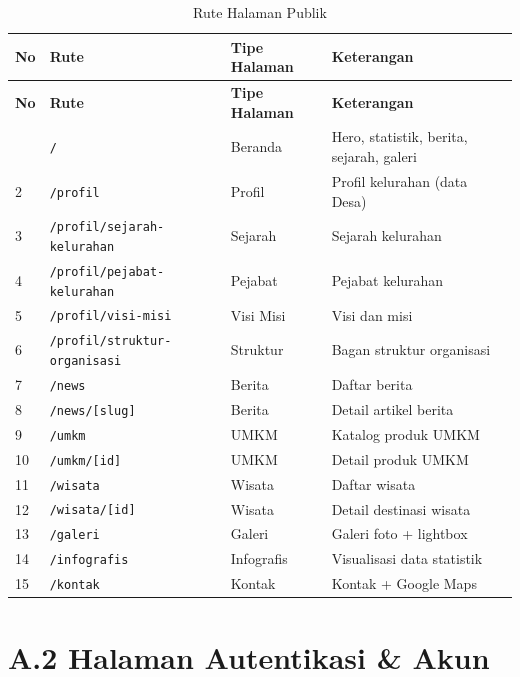 \documentclass[12pt,a4paper]{report}
\begin{document}
\begin{longtable}{p{} p{} p{} p{}}
    \caption{Rute Halaman Publik}\\
    \toprule
    \textbf{No} & \textbf{Rute} & \textbf{Tipe Halaman} & \textbf{Keterangan} \\
    \midrule
    \endfirsthead
    \toprule
    \textbf{No} & \textbf{Rute} & \textbf{Tipe Halaman} & \textbf{Keterangan} \\
    \midrule
    \endhead
    \bottomrule
    \endfoot
    1 & \texttt{/} & Beranda & Hero, statistik, berita, sejarah, galeri \\
    2 & \texttt{/profil} & Profil & Profil kelurahan (data Desa) \\
    3 & \texttt{/profil/sejarah-kelurahan} & Sejarah & Sejarah kelurahan \\
    4 & \texttt{/profil/pejabat-kelurahan} & Pejabat & Pejabat kelurahan \\
    5 & \texttt{/profil/visi-misi} & Visi Misi & Visi dan misi \\
    6 & \texttt{/profil/struktur-organisasi} & Struktur & Bagan struktur organisasi \\
    7 & \texttt{/news} & Berita & Daftar berita \\
    8 & \texttt{/news/[slug]} & Berita & Detail artikel berita \\
    9 & \texttt{/umkm} & UMKM & Katalog produk UMKM \\
    10 & \texttt{/umkm/[id]} & UMKM & Detail produk UMKM \\
    11 & \texttt{/wisata} & Wisata & Daftar wisata \\
    12 & \texttt{/wisata/[id]} & Wisata & Detail destinasi wisata \\
    13 & \texttt{/galeri} & Galeri & Galeri foto + lightbox \\
    14 & \texttt{/infografis} & Infografis & Visualisasi data statistik \\
    15 & \texttt{/kontak} & Kontak & Kontak + Google Maps \\
    \end{longtable}

\section*{A.2 Halaman Autentikasi \& Akun}
\end{document}
